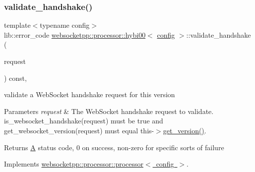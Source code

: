 \subsubsection{\texorpdfstring{validate\+\_\+handshake()}{validate\_handshake()}}
{\footnotesize\ttfamily template$<$typename config$>$ \\
lib\+::error\+\_\+code \mbox{\hyperlink{classwebsocketpp_1_1processor_1_1hybi00}{websocketpp\+::processor\+::hybi00}}$<$ \mbox{\hyperlink{classconfig}{config}} $>$\+::validate\+\_\+handshake (\begin{DoxyParamCaption}\item[{\mbox{\hyperlink{classwebsocketpp_1_1http_1_1parser_1_1request}{request\+\_\+type}} const \&}]{request }\end{DoxyParamCaption}) const\hspace{0.3cm}{\ttfamily [inline]}, {\ttfamily [virtual]}}



validate a Web\+Socket handshake request for this version 


\begin{DoxyParams}{Parameters}
{\em request} & The Web\+Socket handshake request to validate. is\+\_\+websocket\+\_\+handshake(request) must be true and get\+\_\+websocket\+\_\+version(request) must equal this-\/$>$\mbox{\hyperlink{classwebsocketpp_1_1processor_1_1hybi00_a9e3f451bd48b1072a377108eba0cf0f5}{get\+\_\+version()}}.\\
\hline
\end{DoxyParams}
\begin{DoxyReturn}{Returns}
\mbox{\hyperlink{struct_a}{A}} status code, 0 on success, non-\/zero for specific sorts of failure 
\end{DoxyReturn}


Implements \mbox{\hyperlink{classwebsocketpp_1_1processor_1_1processor_a8828f7d91c534309deb966b783eb1f8e}{websocketpp\+::processor\+::processor$<$ config $>$}}.

\mbox{\label{classwebsocketpp_1_1processor_1_1hybi00_a8c7e9edc5eec497d908095ab7a848f2e}} 
